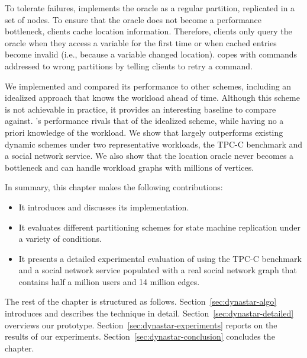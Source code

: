 To tolerate failures, \dynastar implements the oracle as a regular partition,
replicated in a set of nodes. To ensure that the oracle does not become a
performance bottleneck, clients cache location information. Therefore, clients
only query the oracle when they access a variable for the first time or when
cached entries become invalid (i.e., because a variable changed location).
\dynastar copes with commands addressed to wrong partitions by telling clients
to retry a command.

We implemented \dynastar and compared its performance to other schemes,
including an idealized approach that knows the workload ahead of time. Although
this scheme is not achievable in practice, it provides an interesting baseline
to compare against. \dynastar's performance rivals that of the idealized scheme,
while having no a priori knowledge of the workload. We show that \dynastar
largely outperforms existing dynamic schemes under two representative workloads,
the TPC-C benchmark and a social network service. We also show that the location
oracle never becomes a bottleneck and can handle workload graphs with millions
of vertices.

In summary, this chapter makes the following contributions:
\begin{itemize}
\item It introduces \dynastar and discusses its implementation.
\item It evaluates different partitioning schemes for state machine replication
under a variety of conditions.
\item It presents a detailed experimental evaluation of \dynastar using the
TPC-C benchmark and a social network service populated with a real social
network graph that contains half a million users and 14 million edges.
\end{itemize}


The rest of the chapter is structured as follows.
Section~\ref{sec:dynastar-algo} introduces \dynastar and describes the technique in detail.
Section~\ref{sec:dynastar-detailed} overviews our prototype.
Section~\ref{sec:dynastar-experiments} reports on the results of our experiments.
Section~\ref{sec:dynastar-conclusion} concludes the chapter.

